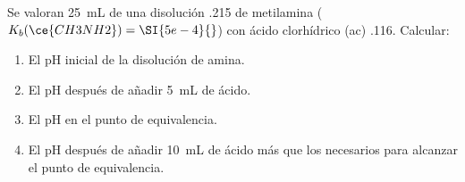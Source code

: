 Se valoran \SI{25}{\milli\liter} de una disolución \SI{,215}{\Molar} de metilamina ($K_b(\ce{CH3NH2})= \SI{5e-4}{}$) con ácido clorhídrico (ac) \SI{,116}{\Molar}. Calcular:
\begin{enumerate}[label={\alph*)},font={\color{red!50!black}\bfseries}]
    \item El pH inicial de la disolución de amina.
    \item El pH después de añadir \SI{5}{\milli\liter} de ácido.
    \item El pH en el punto de equivalencia.
    \item El pH después de añadir \SI{10}{\milli\liter} de ácido más que los necesarios para alcanzar el punto de equivalencia.
\end{enumerate}
